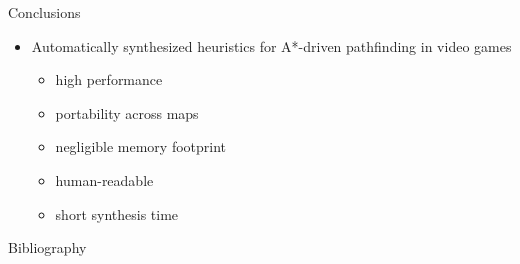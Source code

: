 \documentclass[aspectratio=169,usenames,dvipsnames]{beamer}
\newcommand{\bei}{\begin{itemize}}
\newcommand{\eei}{\end{itemize}}
\newcommand{\ie}{\item}
\numberwithin{equation}{section}
\numberwithin{theorem}{section}
\numberwithin{lem}{section}
\numberwithin{df}{section}
\begin{document}

\begin{frame}{Conclusions}

\bei

\ie Automatically synthesized heuristics for A*-driven pathfinding in video games

\medskip

\bei

\ie high performance

\medskip

\ie portability across maps

\medskip

\ie negligible memory footprint

\medskip

\ie human-readable

\medskip

\ie short synthesis time 

\eei

\eei

\end{frame}




\begin{frame}[allowframebreaks]{Bibliography}
\renewcommand*{\bibfont}{\footnotesize}
\printbibliography
\end{frame}

\end{document}
